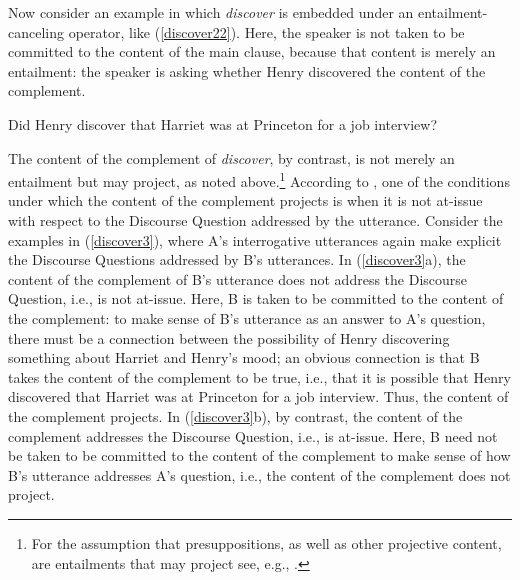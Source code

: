 \documentclass[11pt,fleqn]{article}
\newcommand{\6}{\mbox{$[\hspace*{-.6mm}[$}}
\newcommand{\9}{\mbox{$]\hspace*{-.6mm}]$}}
\begin{document}
Now consider an example in which {\em discover} is embedded under an entailment-canceling operator, like (\ref{discover22}). Here, the speaker is not taken to be committed to the content of the main clause, because that content is merely an entailment: the speaker is asking whether Henry discovered the content of the complement.

\begin{exe}
\ex\label{discover22} Did Henry discover that Harriet was at Princeton for a job interview?
\end{exe}
The content of the complement of {\em discover}, by contrast, is not merely an entailment but may project, as noted above.\footnote{For the assumption that presuppositions, as well as other projective content, are entailments that may project see, e.g., \citealt{gazdar79b,barker02,schlenker10,abrusan2011,abrusan2016,anand-hacquard2014}. } According to \citealt{best-question}, one of the conditions under which the content of the complement projects is when it is not at-issue with respect to the Discourse Question addressed by the utterance. Consider the examples in (\ref{discover3}), where A's interrogative utterances again make explicit the Discourse Questions addressed by B's utterances. In (\ref{discover3}a), the content of the complement of B's utterance does not address the Discourse Question, i.e., is not at-issue. Here, B is taken to be committed to the content of the complement: to make sense of B's utterance as an answer to A's question, there must be a connection between the possibility of Henry discovering something about Harriet and Henry's mood; an obvious connection is that B takes the content of the complement to be true, i.e., that it is possible that Henry discovered that Harriet was at Princeton for a job interview. Thus, the content of the complement projects. In (\ref{discover3}b), by contrast, the content of the complement addresses the Discourse Question, i.e., is at-issue. Here, B need not be taken to be committed to the content of the complement to make sense of how B's utterance addresses A's question, i.e., the content of the complement does not project.
\end{document}
